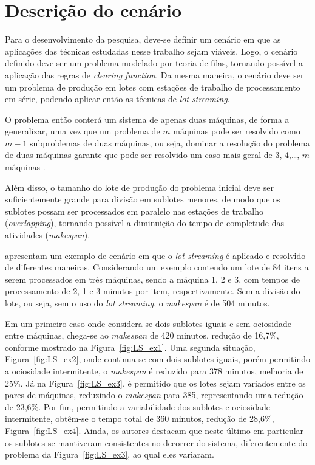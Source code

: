 \section{Descrição do cenário} \label{sec:cenario}
Para o desenvolvimento da pesquisa, deve-se definir um cenário em que as aplicações das técnicas estudadas nesse trabalho sejam viáveis. Logo, o cenário definido deve ser um problema modelado por teoria de filas, tornando possível a aplicação das regras de \textit{clearing function}. Da mesma maneira, o cenário deve ser um problema de produção em lotes com estações de trabalho de processamento em série, podendo aplicar então as técnicas de \textit{lot streaming}.

O problema então conterá um sistema de apenas duas máquinas, de forma a generalizar, uma vez que um problema de $m$ máquinas pode ser resolvido como $m-1$ subproblemas de duas máquinas, ou seja, dominar a resolução do problema de duas máquinas garante que pode ser resolvido um caso mais geral de 3, 4,\ldots, $m$ máquinas \cite{Potts1989,Trietsch1993,Baker1995}.

Além disso, o tamanho do lote de produção do problema inicial deve ser suficientemente grande para divisão em sublotes menores, de modo que os sublotes possam ser processados em paralelo nas estações de trabalho (\textit{overlapping}), tornando possível a diminuição do tempo de completude das atividades (\textit{makespan}).

 apresentam um exemplo de cenário em que o \textit{lot streaming} é aplicado e resolvido de diferentes maneiras. Considerando um exemplo contendo um lote de 84 itens a serem processados em três máquinas, sendo a máquina 1, 2 e 3, com tempos de processamento de 2, 1 e 3 minutos por item, respectivamente. Sem a divisão do lote, ou seja, sem o uso do \textit{lot streaming}, o \textit{makespan} é de 504 minutos. 

Em um primeiro caso onde considera-se dois sublotes iguais e sem ociosidade entre máquinas, chega-se ao \textit{makespan} de 420 minutos, redução de 16,7\%, conforme mostrado na Figura~\ref{fig:LS_ex1}. Uma segunda situação, Figura~\ref{fig:LS_ex2}, onde continua-se com dois sublotes iguais, porém permitindo a ociosidade intermitente, o \textit{makespan} é reduzido para 378 minutos, melhoria de 25\%. Já na Figura~\ref{fig:LS_ex3}, é permitido que os lotes sejam variados entre os pares de máquinas, reduzindo o \textit{makespan} para 385, representando uma redução de 23,6\%. Por fim, permitindo a variabilidade dos sublotes e ociosidade intermitente, obtêm-se o tempo total de 360 minutos, redução de 28,6\%, Figura~\ref{fig:LS_ex4}. Ainda, os autores destacam que neste último em particular os sublotes se mantiveram consistentes no decorrer do sistema, diferentemente do problema da Figura~\ref{fig:LS_ex3}, ao qual eles variaram.







